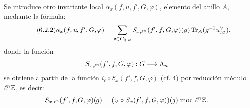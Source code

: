 Se introduce otro invariante local $\alpha_x(f,u,f',G,\varphi)$, elemento del anillo $A$, mediante la fórmula:
\begin{equation}\tag{6.2.2}
\alpha_x(f,u,f',G,\varphi)=
\sum_{g\in G_{\natural,\varphi}}
S_{x,\ell^n}(f',f,G,\varphi)(g)\operatorname{Tr}_A(g^{-1}u_M^\vee),
\end{equation}
donde la función
\[
S_{x,\ell^n}(f',f,G,\varphi):G\longrightarrow\Lambda_n
\]
se obtiene a partir de la función $i_\ell\circ S_x(f',f,G,\varphi)$ (cf. 4) por reducción módulo $\ell^n\mathbb Z$, es decir:%
\[
S_{x,\ell^n}(f',f,G,\varphi)(g)=
(i_\ell\circ S_x(f',f,G,\varphi))(g)\bmod \ell^n\mathbb Z.
\]
